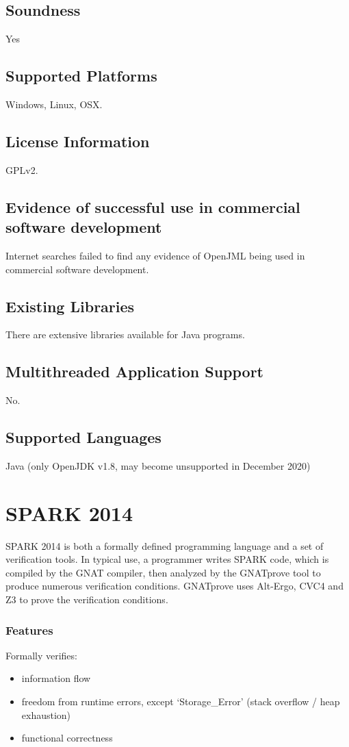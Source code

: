 \documentclass[12pt,openany,a4paper]{book}
\begin{document}
	\subsection{Soundness}
	Yes
	\subsection{Supported Platforms}
	Windows, Linux, OSX.
	\subsection{License Information}
		GPLv2.
	\subsection{Evidence of successful use in commercial software development} 
		Internet searches failed to find any evidence of OpenJML being used in commercial software development. 

	\subsection{Existing Libraries} 
		There are extensive libraries available for Java programs.
	\subsection{Multithreaded Application Support}
	No.
	\subsection{Supported Languages}
	Java (only OpenJDK v1.8, may become unsupported in December 2020)

\section{SPARK 2014}
	SPARK 2014 is both a formally defined programming language and a set of verification tools. In typical use, a programmer writes SPARK code, which is compiled by the GNAT compiler, then analyzed by the GNATprove tool to produce numerous verification conditions. GNATprove uses Alt-Ergo, CVC4 and Z3 to prove the verification conditions.

	\subsubsection{Features}
	Formally verifies:
	\begin{itemize}
		\item information flow
		\item freedom from runtime errors, except `Storage\_Error' (stack overflow / heap exhaustion)
		\item functional correctness
	\end{itemize}
\end{document}
